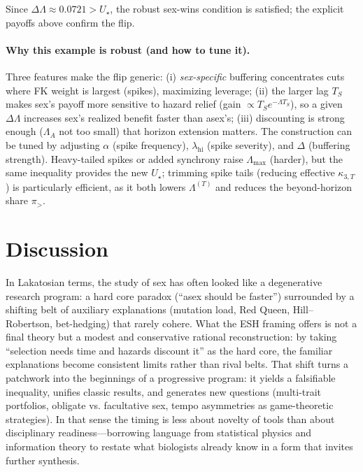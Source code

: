 \documentclass[11pt]{article}
\theoremstyle{upright}
\newcommand{\horizon}{\Lambda}
\newcommand{\Lmax}{\horizon^{(T)}_{\max}}
\newcommand{\hazT}[1]{\Lambda^{(#1)}}          %
\renewcommand{\Lmax}{\Lambda_{\max}}
\begin{document}
Since $\Delta\Lambda\approx 0.0721>U_\star$, the robust sex-wins condition is satisfied; the explicit payoffs above confirm the flip.

\paragraph{Why this example is robust (and how to tune it).}
Three features make the flip generic: (i) \emph{sex-specific} buffering concentrates cuts where FK weight is largest (spikes), maximizing leverage; (ii) the larger lag $T_S$ makes sex’s payoff more sensitive to hazard relief (gain $\propto T_S e^{-\Lambda T_S}$), so a given $\Delta\Lambda$ increases sex’s realized benefit faster than asex’s; (iii) discounting is strong enough ($\Lambda_A$ not too small) that horizon extension matters. The construction can be tuned by adjusting $\alpha$ (spike frequency), $\lambda_{\mathrm{hi}}$ (spike severity), and $\Delta$ (buffering strength). Heavy-tailed spikes or added synchrony raise $\Lmax$ (harder), but the same inequality provides the new $U_\star$; trimming spike tails (reducing effective $\kappa_{3,T}$) is particularly efficient, as it both lowers $\hazT{T}$ and reduces the beyond-horizon share $\pi_{>}$.

\section{Discussion}
\label{sec:discussion}

In Lakatosian terms, the study of sex has often looked like a degenerative research program: a hard core paradox (“asex should be faster”) 
surrounded by a shifting belt of auxiliary explanations (mutation load, Red Queen, Hill–Robertson, bet-hedging) that rarely cohere. What the 
ESH framing offers is not a final theory but a modest and conservative rational reconstruction: by taking “selection needs time and hazards discount it” as 
the hard core, the familiar explanations become consistent limits rather than rival belts. That shift turns a patchwork into the beginnings of a 
progressive program: it yields a falsifiable inequality, unifies classic results, and generates new questions (multi-trait portfolios, obligate vs. 
facultative sex, tempo asymmetries as game-theoretic strategies). In that sense the timing is less about novelty of tools than about disciplinary 
readiness—borrowing language from statistical physics and information theory to restate what biologists already know in a form that invites 
further synthesis.
\end{document}
